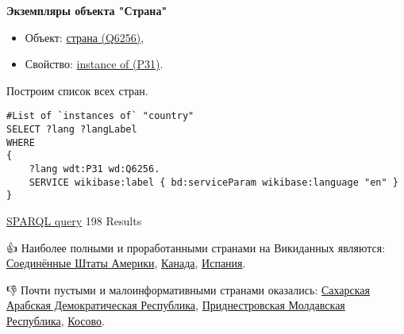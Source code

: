 \textbf{Экземпляры объекта "Страна"}

\begin{itemize}
    \item Объект: \href{https://www.wikidata.org/wiki/Q6256}{страна (Q6256)},
    \item Свойство: \href{https://www.wikidata.org/wiki/Property:P31}{instance of (P31)}.
\end{itemize}

Построим список всех стран.

\begin{lstlisting}[language=SPARQL]
#List of `instances of` "country" 
SELECT ?lang ?langLabel
WHERE
{
    ?lang wdt:P31 wd:Q6256.
    SERVICE wikibase:label { bd:serviceParam wikibase:language "en" }
}
\end{lstlisting}

\href{https://query.wikidata.org/#%23added%202017-02%0A%23List%20of%20%60instances%20of%60%20%22country%22%20%0ASELECT%20%3Flang%20%3FlangLabel%0AWHERE%0A%7B%0A%20%20%20%20%3Flang%20wdt%3AP31%20wd%3AQ6256.%0A%20%20%20%20SERVICE%20wikibase%3Alabel%20%7B%20bd%3AserviceParam%20wikibase%3Alanguage%20%22en%22%20%7D%0A%7D}{SPARQL query} 198 Results

👍 Наиболее полными и проработанными странами на Викиданных являются:
\href{https://www.wikidata.org/wiki/Q30}{Соединённые Штаты Америки}, 
\href{https://www.wikidata.org/wiki/Q16}{Канада},
\href{https://www.wikidata.org/wiki/Q29}{Испания}.

👎 Почти пустыми и малоинформативными странами оказались:
\href{https://www.wikidata.org/wiki/Q40362}{Сахарская Арабская Демократическая Республика},
\href{https://www.wikidata.org/wiki/Q907112}{Приднестровская Молдавская Республика},
\href{https://www.wikidata.org/wiki/Q1246}{Косово}.
